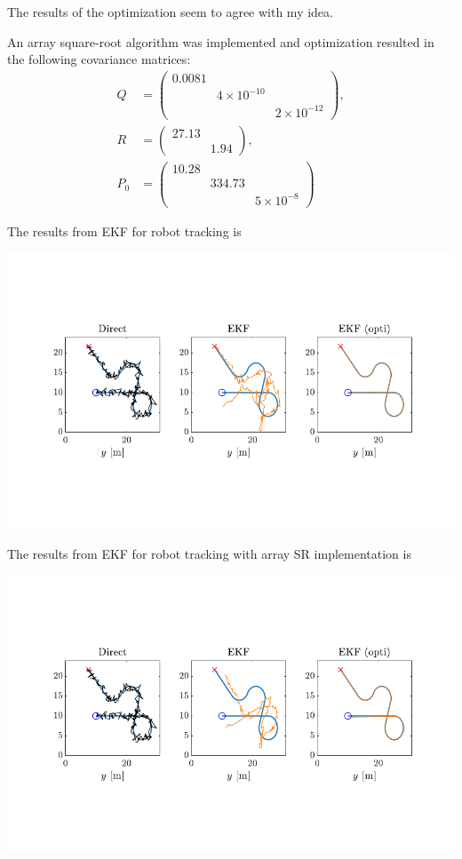 The results of the optimization seem to agree with my idea.

An array square-root algorithm was implemented and optimization resulted in the following covariance matrices:
\begin{align*}
    Q &= \begin{pmatrix}
        0.0081 & & \\ & 4\times10^{-10} & \\ & & 2\times10^{-12}
    \end{pmatrix}, \\
    R &= \begin{pmatrix}
        27.13 & \\ & 1.94
    \end{pmatrix}, \\
    P_0 &= \begin{pmatrix}
        10.28 & & \\ & 334.73 & \\ & & 5\times10^{-8}
    \end{pmatrix}
\end{align*}

The results from EKF for robot tracking is 

\includegraphics{figures/EKF_Le3.pdf}

The results from EKF for robot tracking with array SR implementation is 

\includegraphics{figures/EKF_Le3_SR.pdf}


